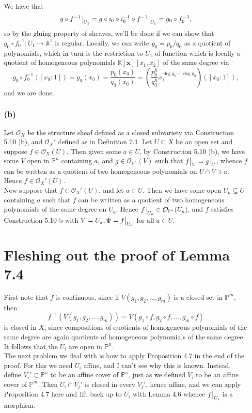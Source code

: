 \documentclass{article}
\newcommand\restr[2]{{%
  \left.\kern-\nulldelimiterspace %
  #1 %
  \vphantom{\big|} %
  \right|_{#2} %
  }}
\theoremstyle{definition}
\newcommand{\K}{\mathbb{K}}
\renewcommand{\P}{\mathbb{P}}
\newcommand{\A}{\mathbb{A}}
\newcommand{\Kx}{\K[\bm{x}]}
\renewcommand{\AA}[1]{\A^{#1}}
\newcommand{\Pn}{\P^n}
\newcommand{\Pm}{\P^m}
\begin{document}
We have that
\[
	\restr{g \circ f^{-1}}{U_1} 
	=
	g \circ i_0 \circ i_0^{-1} \circ \restr{f^{-1}}{U_1} 
	= 
	g_0 \circ f_0^{-1},
\]
so by the gluing property of sheaves, we'll be done if we can show that $g_0
\circ f_0^{-1} : U_1 \to \AA{1}$ is regular. Locally, we can write $g_0 =
p_0/q_0$ as a quotient of polynomials, which in turn is the restriction to
$U_1$ of function which is locally a quotient of homogeneous polynomials
$\Kx[x_1,x_2]$ of the same degree via
\[
	g_0 \circ f_0^{-1}([x_0 : 1]) 
	= 
	g_0(x_0) 
	= 
	\frac{p_0(x_0)}{q_0(x_0)}
	= 
	\left(\frac{p_0^{h}}{q_0^{h}}x_1^{\deg q_0 - \deg p_0}\right)([x_0 : 1]),
\]
and we are done.

\subsubsection*{(b)}

Let $\mathcal{O}_{X}$ be the structure sheaf defined as a closed subvariety via
Construction 5.10 (b), and $\mathcal{O}_X'$ defined as in Definition 7.1. Let
$U \subseteq X$ be an open set and suppose $f \in \mathcal{O}_X(U)$. Then given
some $a \in U$, by Construction 5.10 (b), we have some $V$ open in $\Pn$
containing $a$, and $g \in \mathcal{O}_{\Pn}(V)$ such that $\restr{f}{V} =
\restr{g}{U}$, whence $f$ can be written as a quotient of two homogeneous
polynomials on $U \cap V \ni a$. Hence $f \in \mathcal{O}_X'(U)$. \\

Now suppose that $f \in \mathcal{O}_X'(U)$, and let $a \in U$. Then we have
some open $U_a \subseteq U$ containing $a$ such that $f$ can be written as a
quotient of two homogeneous polynomials of the same degree on $U_a$. Hence
$\restr{f}{U_a} \in \mathcal{O}_{\Pn}(U_a)$, and $f$ satisfies Construction
5.10 b with $V = U_a, \Psi = \restr{f}{U_a}$ for all $a \in U$.

\section*{Fleshing out the proof of Lemma 7.4}

First note that $f$ is continuous, since if $V(g_1, g_2, \ldots, g_m)$ is a
closed set in $\Pm$, then
\[
	f^{-1}(V(g_1, g_2, \ldots, g_m))
	=
	V(g_1 \circ f, g_2 \circ f, \ldots, g_m \circ f)
\] 
is closed in $X$, since compositions of quotients of homogeneous polynomials of
the same degree are again quotients of homogeneous polynomials of the same
degree. It follows that the $U_i$ are open in $\Pn$. \\

The next problem we deal with is how to apply Proposition 4.7 in the end of the
proof. For this we need $U_i$ affine, and I can't see why this is known.
Instead, define $V_i' \subset \Pn$ to be an affine cover of $\Pn$, just as we
defined $V_i$ to be an affine cover of $\Pm$. Then $U_i \cap V_j'$ is closed in
every $V_j'$, hence affine, and we can apply Proposition 4.7 here and lift back
up to $U_i$ with Lemma 4.6 whence $\restr{f}{U_i}$ is a morphism.
\end{document}
